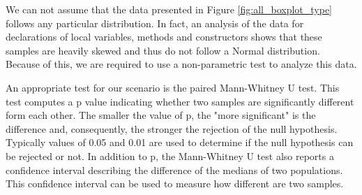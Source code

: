 \documentclass[preprint]{sigplanconf}
\begin{document}
We can not assume that the data presented in Figure \ref{fig:all_boxplot_type} follows any particular distribution.
In fact, an analysis of the data for declarations of local variables, methods and constructors shows that these samples are heavily skewed and thus do not follow a Normal distribution.
Because of this, we are required to use a non-parametric test to analyze this data.

An appropriate test for our scenario is the paired Mann-Whitney U test.
This test computes a p value indicating whether two samples are significantly different form each other.
The smaller the value of p, the "more significant" is the difference and, consequently, the stronger the rejection of the null hypothesis.
Typically values of 0.05 and 0.01 are used to determine if the null hypothesis can be rejected or not.
In addition to p, the Mann-Whitney U test also reports a confidence interval describing the difference of the medians of two populations.
This confidence interval can be used to measure how different are two samples.

\end{document}
